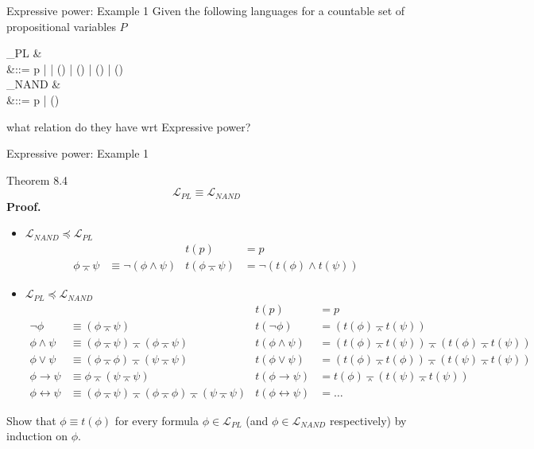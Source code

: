 \documentclass{beamer}
\newcommand{\lang}{\mathcal{L}}
\begin{document}
\begin{frame}{Expressive power: Example 1}
	Given the following languages for a countable set of propositional variables $P$
	\begin{flalign*}
		\lang_{PL} &\\
			&\phi ::= p | \neg \phi | \left(\phi \wedge \phi\right) | \left(\phi \vee \phi\right) | \left(\phi \rightarrow \phi\right) | \left(\phi \leftrightarrow \phi\right)\\
		\lang_{NAND} &\\
			&\phi ::= p | \left(\phi \barwedge \phi\right)
	\end{flalign*}
	what relation do they have wrt Expressive power?
\end{frame}

\begin{frame}{Expressive power: Example 1}
	\begin{scriptsize}
	\begin{block}{\scriptsize Theorem 8.4}
		\[\lang_{PL} \equiv \lang_{NAND}\] \pause
		\textbf{Proof.}
		\begin{itemize}
			\item $\lang_{NAND} \preceq \lang_{PL}$
				\begin{align*}
					& & t(p) &= p\\
					\phi \barwedge \psi &\equiv \neg (\phi \wedge \psi) & t(\phi \barwedge \psi) &= \neg (t(\phi) \wedge t(\psi))
				\end{align*}
			\item $\lang_{PL} \preceq \lang_{NAND}$
				\begin{align*}
				& & t(p) &= p\\
					\neg \phi &\equiv (\phi \barwedge \psi) & t(\neg \phi) &= (t(\phi) \barwedge t(\psi))\\
					\phi \wedge \psi &\equiv (\phi \barwedge \psi) \barwedge (\phi \barwedge \psi) & t(\phi \wedge \psi) &= (t(\phi) \barwedge t(\psi)) \barwedge (t(\phi) \barwedge t(\psi))\\
					\phi \vee \psi &\equiv (\phi \barwedge \phi) \barwedge (\psi \barwedge \psi) & t(\phi \vee \psi) &= (t(\phi) \barwedge t(\phi)) \barwedge (t(\psi) \barwedge t(\psi))\\
					\phi \rightarrow \psi &\equiv \phi \barwedge (\psi \barwedge \psi) & t(\phi \rightarrow \psi) &= t(\phi) \barwedge (t(\psi) \barwedge t(\psi))\\
					\phi \leftrightarrow \psi &\equiv (\phi \barwedge \psi) \barwedge (\phi \barwedge \phi) \barwedge (\psi \barwedge \psi) & t(\phi \leftrightarrow \psi) &= \dots 
				\end{align*}
		\end{itemize}
		Show that $\phi \equiv t(\phi)$ for every formula $\phi \in \lang_{PL}$ (and $\phi \in \lang_{NAND}$ respectively) by induction on $\phi$.
	\end{block}
	\end{scriptsize}
\end{frame}
\end{document}
